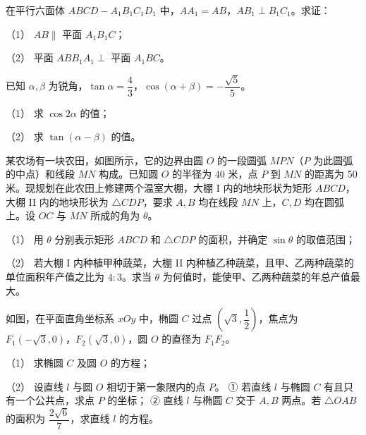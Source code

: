 \Needspace{0.4\textheight}
\begin{question}
在平行六面体 $ABCD - A_1B_1C_1D_1$ 中，$AA_1 = AB$，$AB_1 \perp B_1C_1$。求证：

（1） $AB \parallel$ 平面 $A_1B_1C$；

（2） 平面 $ABB_1A_1 \perp$ 平面 $A_1BC$。
\nopagebreak[4]
\begin{center}\end{center}
\nopagebreak[4]
\end{question}
\begin{question}
已知 $\alpha, \beta$ 为锐角，$\tan\alpha = \dfrac{4}{3}$，$\cos(\alpha + \beta) = -\dfrac{\sqrt{5}}{5}$。

（1） 求 $\cos 2\alpha$ 的值；

（2） 求 $\tan(\alpha - \beta)$ 的值。

\Needspace{0.4\textheight}
\end{question}
\begin{question}
某农场有一块农田，如图所示，它的边界由圆 $O$ 的一段圆弧 $MPN$（$P$ 为此圆弧的中点）和线段 $MN$ 构成。已知圆 $O$ 的半径为 40 米，点 $P$ 到 $MN$ 的距离为 50 米。现规划在此农田上修建两个温室大棚，大棚 I 内的地块形状为矩形 $ABCD$，大棚 II 内的地块形状为 $\triangle CDP$，要求 $A, B$ 均在线段 $MN$ 上，$C, D$ 均在圆弧上。设 $OC$ 与 $MN$ 所成的角为 $\theta$。

（1） 用 $\theta$ 分别表示矩形 $ABCD$ 和 $\triangle CDP$ 的面积，并确定 $\sin\theta$ 的取值范围；

（2） 若大棚 I 内种植甲种蔬菜，大棚 II 内种植乙种蔬菜，且甲、乙两种蔬菜的单位面积年产值之比为 $4 : 3$。求当 $\theta$ 为何值时，能使甲、乙两种蔬菜的年总产值最大。
\nopagebreak[4]
\begin{center}\end{center}
\nopagebreak[4]
\Needspace{0.4\textheight}
\end{question}
\begin{question}
如图，在平面直角坐标系 $xOy$ 中，椭圆 $C$ 过点 $\left(\sqrt{3}, \dfrac{1}{2}\right)$，焦点为 $F_1(-\sqrt{3}, 0)$，$F_2(\sqrt{3}, 0)$，圆 $O$ 的直径为 $F_1F_2$。

（1） 求椭圆 $C$ 及圆 $O$ 的方程；

（2） 设直线 $l$ 与圆 $O$ 相切于第一象限内的点 $P$。
① 若直线 $l$ 与椭圆 $C$ 有且只有一个公共点，求点 $P$ 的坐标；
② 直线 $l$ 与椭圆 $C$ 交于 $A, B$ 两点。若 $\triangle OAB$ 的面积为 $\dfrac{2\sqrt{6}}{7}$，求直线 $l$ 的方程。
\nopagebreak[4]
\begin{center}\end{center}
\nopagebreak[4]
\end{question}
